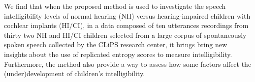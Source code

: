 We find that when the proposed method is used to investigate the speech intelligibility levels of normal hearing (NH) versus hearing-impaired children with cochlear implants (HI/CI), in a data composed of ten utterances recordings from thirty two NH and HI/CI children selected from a large corpus of spontaneously spoken speech collected by the CLiPS research center, it brings bring new insights about the use of replicated entropy scores to measure intelligibility. Furthermore, the method also provide a way to assess how some factors affect the (under)development of children's intelligibility.


\begin{comment}
	
	Fourth, we implement all of the above in a data set consisting of repeated entropy measures, with the purpose of determine which factors affect the \textit{speech intelligibility} levels of normal hearing (NH) versus hearing-impaired children with cochlear implants (HI/CI). The entropy measures were calculated using the transcriptions of one hundred language students from the University of Antwerp, where each student transcribed the stimuli to the Qualtrics environment \citep{Qualtrics_2005}. The stimuli consisted in ten utterances recordings for each of the thirty two NH and HI/CI children, selected from a large corpus of \textit{spontaneously spoken speech} collected by the Computational Linguistic and Psycholinguistics Research Centre (CLiPS).

On the one hand, the method reveal that, not integrating the bounded nature of the data in the modeling procedure could lead us to wrongful statistical conclusions. More precisely, it could lead us to an overestimation of the parameter estimates' precision.

Lastly, our hypothesis tests reveal that hearing impaired children with cochlear implants (HI/CI) and genetic etiology have similar levels of intelligibility as normal hearing kids (NH), when both groups have a `hearing ages' of five. However, the same cannot be said for children with other etiologies, like CMV infection or other causes, as they start a significantly lower level of intelligibility at same `ages'. Moreover, our tests found enough evidence to assert that NH children develop their intelligibility with each `hearing year' at a higher rate than HI/CI kids. This offer evidence contrary to what was previously found \citep{Boonen_et_al_2021}.

Finally, we observe our results support the hypothesis that HI/CI children with severe hearing loss, as accounted by the pure tone average, develop their language at a slower rate than their NH counterparts.

\end{comment}
%
%
